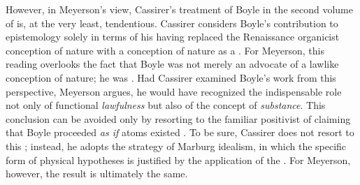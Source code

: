 \documentclass[submitted,12pt]{article}
\begin{document}
However, in Meyerson's view, Cassirer's treatment of Boyle in the second volume of \EPt is, at the very least, tendentious. Cassirer considers Boyle's contribution to epistemology solely in terms of his having replaced the Renaissance organicist conception of nature with a conception of nature as a  \citep[312--313]{Cassirer1907b}. For Meyerson, this reading overlooks the fact that Boyle was not merely an advocate of a lawlike conception of nature; he was  \citep[122--123]{Meyerson1911}. Had Cassirer examined Boyle's work from this perspective, Meyerson argues, he would have recognized the indispensable role not only of functional \emph{lawfulness}  but also of the concept of \emph{substance}. This conclusion can be avoided only by resorting to the familiar positivist  of claiming that Boyle proceeded \textit{as if} atoms existed \citep[123]{Meyerson1911}. To be sure, Cassirer does not resort to this ; instead, he adopts the strategy of Marburg idealism, in which the specific form of physical hypotheses is justified by the application of the  \citep[123]{Meyerson1911}. For Meyerson, however, the result is ultimately the same.
\end{document}
